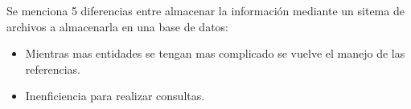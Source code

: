 \documentclass[10pt]{article}
\begin{document}
    
    
    \noindent Se menciona 5 diferencias entre almacenar la información mediante un sitema de archivos a almacenarla en una base de datos:
    
    \begin{itemize}
    	\item Mientras mas entidades se tengan mas complicado se vuelve el manejo de las referencias.
    	\item Inenficiencia para realizar consultas.
    \end{itemize}
    
\end{document}
